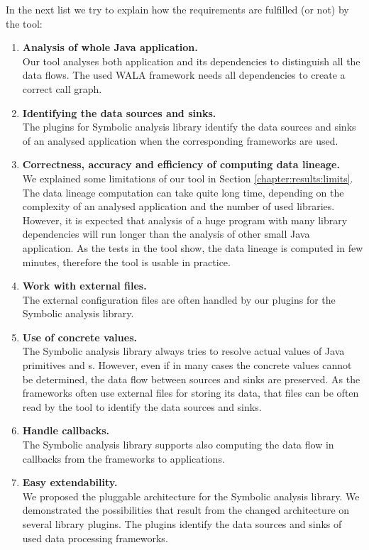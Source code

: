 In the next list we try to explain how the requirements are fulfilled (or not)
by the \ToolName tool:
\begin{enumerate}
  \item \textbf{Analysis of whole Java application.} \\
    Our tool analyses both application and its dependencies
    to distinguish all the data flows. The used WALA framework
    needs all dependencies to create a correct call graph.
  \item \textbf{Identifying the data sources and sinks.} \\
    The plugins for Symbolic analysis library identify the data sources and sinks
    of an analysed application when the corresponding frameworks are used.
  \item \textbf{Correctness, accuracy and efficiency of computing data lineage.} \\
    We explained some limitations of our \ToolName tool in Section \ref{chapter:results:limits}.
    The data lineage computation can take quite long time, depending on the complexity of an analysed
    application and the number of used libraries.
    However, it is expected that analysis of a huge program with many library dependencies
    will run longer than the analysis of other small Java application.
    As the tests in the \ToolName tool show, the data lineage is computed
    in few minutes, therefore the tool is usable in practice.
  \item \textbf{Work with external files.} \\
    The external configuration files are often handled by our plugins for the Symbolic analysis library.
  \item \textbf{Use of concrete values.} \\
    The Symbolic analysis library always tries to resolve actual values of Java primitives and
    s. However, even if in many cases the concrete values cannot be determined,
    the data flow between sources and sinks are preserved.
    As the frameworks often use external files for storing its data, that files can be often read
    by the \ToolName tool to identify the data sources and sinks.
  \item \textbf{Handle callbacks.} \\
    The Symbolic analysis library supports also computing the data flow in callbacks
    from the frameworks to applications.
  \item \textbf{Easy extendability.} \\
    We proposed the pluggable architecture for the Symbolic analysis library.
    We demonstrated the possibilities that result from the changed architecture
    on several library plugins. The plugins identify the data sources and sinks
    of used data processing frameworks.
\end{enumerate}


